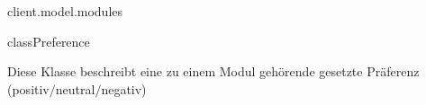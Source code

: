 \begin{texdocpackage}{client.model.modules}
\begin{texdocclass}{class}{Preference}
\label{texdoclet:edu.kit.informatik.studyplan.client.model.modules.Preference}
\begin{texdocclassintro}
Diese Klasse beschreibt eine zu einem Modul gehörende gesetzte Präferenz
 (positiv$/$neutral$/$negativ)\end{texdocclassintro}
\begin{texdocclassconstructors}
\end{texdocclassconstructors}
\begin{texdocclassmethods}
\end{texdocclassmethods}
\end{texdocclass}


\end{texdocpackage}





